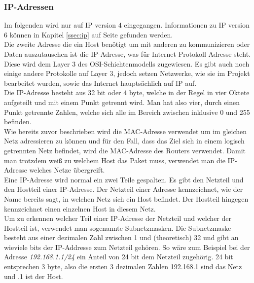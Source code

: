 \documentclass[11pt,a4paper]{report}
\begin{document}
\subsubsection{IP-Adressen}
Im folgenden wird nur auf IP version 4 eingegangen. Informationen zu IP version 6 können in Kapitel \ref{ssec:ip} auf Seite \pageref{ssec:ip} gefunden werden.\\

Die zweite Adresse die ein Host benötigt um mit anderen zu kommunizieren oder Daten auszutauschen ist die IP-Adresse, was für Internet Protokoll Adresse steht. Diese wird dem Layer 3 des OSI-Schichtenmodells zugewiesen. Es gibt auch noch einige andere Protokolle auf Layer 3, jedoch setzen Netzwerke, wie sie im Projekt bearbeitet wurden, sowie das Internet hauptsächlich auf IP auf.\\

Die IP-Adresse besteht aus 32 bit oder 4 byte, welche in der Regel in vier Oktete aufgeteilt und mit einem Punkt getrennt wird. Man hat also vier, durch einen Punkt getrennte Zahlen, welche sich alle im Bereich zwischen inklusive 0 und 255 befinden.\\

Wie bereits zuvor beschrieben wird die MAC-Adresse verwendet um im gleichen Netz adressieren zu können und für den Fall, dass das Ziel sich in einem logisch getrennten Netz befindet, wird die MAC-Adresse des Routers verwendet. Damit man trotzdem weiß zu welchem Host das Paket muss, verwendet man die IP-Adresse welches Netze übergreift.\\

Eine IP-Adresse wird normal ein zwei Teile gespalten. Es gibt den Netzteil und den Hostteil einer IP-Adresse. Der Netzteil einer Adresse kennzeichnet, wie der Name bereits sagt, in welchen Netz sich ein Host befindet. Der Hostteil hingegen kennzeichnet einen einzelnen Host in diesem Netz.\\
Um zu erkennen welcher Teil einer IP-Adresse der Netzteil und welcher der Hostteil ist, verwendet man sogenannte Subnetzmasken. Die Subnetzmaske besteht aus einer dezimalen Zahl zwischen 1 und (theoretisch) 32 und gibt an wieviele bits der IP-Addresse zum Netzteil gehören. So wäre zum Beispiel bei der Adresse \textit{192.168.1.1/24} ein Anteil von 24 bit dem Netzteil zugehörig. 24 bit entsprechen 3 byte, also die ersten 3 dezimalen Zahlen 192.168.1 sind das Netz und .1 ist der Host.
\end{document}
